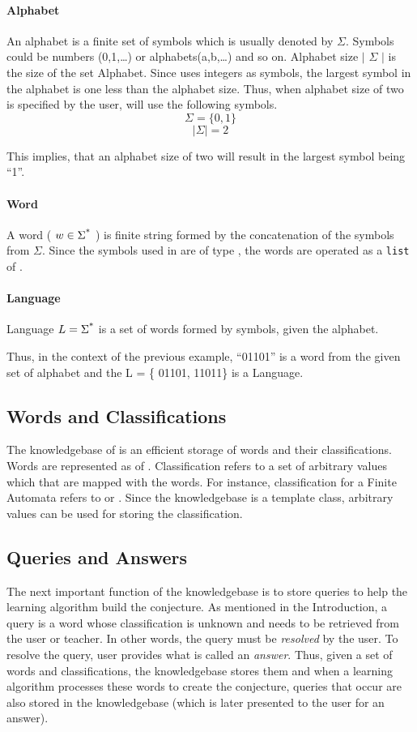 \paragraph{Alphabet} An alphabet is a finite set of symbols which is usually denoted by $\Sigma$. 
Symbols could be numbers (0,1,\ldots) or alphabets(a,b,\ldots) and so on. 
Alphabet size $\mid$ $\Sigma$ $\mid$ is the size of the set Alphabet. Since \libalf uses integers as symbols, the largest symbol in the alphabet is one less than the alphabet size.
Thus, when alphabet size of two is specified by the user, \libalf will use the following symbols. 
\[
\Sigma = \{0,1\}
\]
\[
\mid \Sigma \mid = 2
\]

This implies, that an alphabet size of two will result in the largest symbol being ``1''.

\paragraph{Word} A word ( $ w \in \Sigma \textsuperscript{*} $ ) is finite string formed by the concatenation of the symbols from $\Sigma$. Since the symbols used in \libalf are of type \integer, the words are operated as a \texttt{list} of \integer.  

\paragraph{Language} Language $ L = \Sigma \textsuperscript{*} $ is a set of words formed by symbols, given the alphabet.

Thus, in the context of the previous example, ``01101'' is a word from the given set of alphabet and the L = \{ 01101, 11011\} is a Language.

\subsection*{Words and Classifications} 
The knowledgebase of \libalf is an efficient storage of words and their classifications. Words are represented as \lists of \integer. Classification refers to a set of arbitrary values which that are mapped with the words. For instance, classification for a Finite Automata refers to \true or \false. Since the knowledgebase is a template class, arbitrary values can be used for storing the classification. 

\subsection*{Queries and Answers} 
The next important function of the knowledgebase is to store queries to help the learning algorithm build the conjecture. As mentioned in the Introduction, a query is a word whose classification is unknown and needs to be retrieved from the user or teacher. In other words, the query must be \emph{resolved} by the user. To resolve the query, user provides what is called an \emph{answer}. Thus, given a set of words and classifications, the knowledgebase stores them and when a learning algorithm processes these words to create the conjecture, queries that occur are also stored in the knowledgebase (which is later presented to the user for an answer).

